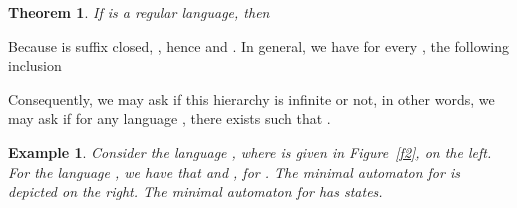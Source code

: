 \documentclass{article}
\newtheorem{theorem}{Theorem}
\newtheorem{example}{Example}
\begin{document}
\begin{theorem}
\label{theo:dss} If  is a regular language, then

\end{theorem}

Because  is suffix closed,  , hence
 and
. 
In general, we have for every , the following inclusion


Consequently, we may ask if this hierarchy is infinite or not, in other words, 
we may ask if for any language ,
there exists  such that . 

\begin{example}
\label{ex:d3}
Consider the language , where  is given 
in Figure~\ref{f2}, on the left. For the language , we have that  and 
 , for . 
The minimal automaton for   is depicted on the right. 
The minimal automaton for  has  states.
\end{example}
\end{document}
